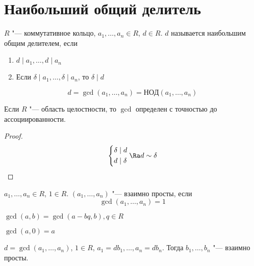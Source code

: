 ﻿\section{Наибольший общий делитель}

\begin{Def}
	$R$ "--- коммутативное кольцо, $a_{1}, \dots, a_{n} \in R$, $d \in R$. $d$ называется наибольшим общим делителем, если
	\begin{enumerate}
		\item $d \mid a_{1}, \dots, d \mid a_{n}$
		\item Если $\delta \mid a_{1}, \dots, \delta \mid a_{n}$, то $\delta \mid d$
	\end{enumerate}
	\[ d = \gcd \left(a_{1}, \dots, a_{n}\right) = НОД(a_1, \dots, a_n) \]
\end{Def}

\begin{Rem}
	Если $R$ "--- область целостности, то $\gcd$ определен с точностью до ассоциированности.
\end{Rem}
\begin{proof}
	\begin{gather*}
		\left\{\begin{aligned}
			\delta &\mid d \\
			d &\mid \delta
		\end{aligned}\right.
		\Ra d \sim \delta
	\end{gather*}
\end{proof}

\begin{Def}
	$a_{1}, \dots, a_{n} \in R$, $1 \in R$.
	$\left(a_{1}, \dots, a_{n}\right)$ "--- взаимно просты, если
	\[ \gcd \left(a_{1}, \dots, a_{n}\right) = 1 \]
\end{Def}

\begin{conseq}
	$\gcd \left(a, b\right) = \gcd \left(a - bq, b\right), q \in R$
\end{conseq}
\begin{conseq}
	$\gcd \left(a, 0\right) = a$
\end{conseq}
\begin{conseq}
	$d = \gcd \left(a_{1}, \dots, a_{n}\right)$, $1 \in R$, $a_{1} = db_{1}, \dots, a_{n} = db_{n}$.
	Тогда $b_{1}, \dots, b_{n}$ "--- взаимно просты.
\end{conseq}

